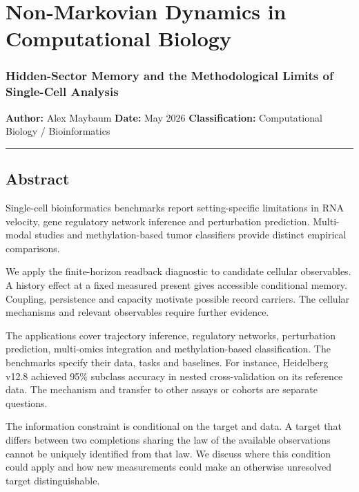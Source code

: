 \documentclass[
]{article}
\author{}
\date{}
\begin{document}
\hypertarget{non-markovian-dynamics-in-computational-biology}{%
\section{Non-Markovian Dynamics in Computational
Biology}\label{non-markovian-dynamics-in-computational-biology}}

\hypertarget{hidden-sector-memory-and-the-methodological-limits-of-single-cell-analysis}{%
\subsubsection{Hidden-Sector Memory and the Methodological Limits of
Single-Cell
Analysis}\label{hidden-sector-memory-and-the-methodological-limits-of-single-cell-analysis}}

\textbf{Author:} Alex Maybaum \textbf{Date:} May 2026
\textbf{Classification:} Computational Biology / Bioinformatics

\begin{center}\rule{0.5\linewidth}{0.5pt}\end{center}

\hypertarget{abstract}{%
\subsection{Abstract}\label{abstract}}

Single-cell bioinformatics benchmarks report setting-specific
limitations in RNA velocity, gene regulatory network inference and
perturbation prediction. Multi-modal studies and methylation-based tumor
classifiers provide distinct empirical comparisons.

We apply the finite-horizon readback diagnostic to candidate cellular
observables. A history effect at a fixed measured present gives
accessible conditional memory. Coupling, persistence and capacity
motivate possible record carriers. The cellular mechanisms and relevant
observables require further evidence.

The applications cover trajectory inference, regulatory networks,
perturbation prediction, multi-omics integration and methylation-based
classification. The benchmarks specify their data, tasks and baselines.
For instance, Heidelberg v12.8 achieved 95\% subclass accuracy in nested
cross-validation on its reference data. The mechanism and transfer to
other assays or cohorts are separate questions.

The information constraint is conditional on the target and data. A
target that differs between two completions sharing the law of the
available observations cannot be uniquely identified from that law. We
discuss where this condition could apply and how new measurements could
make an otherwise unresolved target distinguishable.
\end{document}
